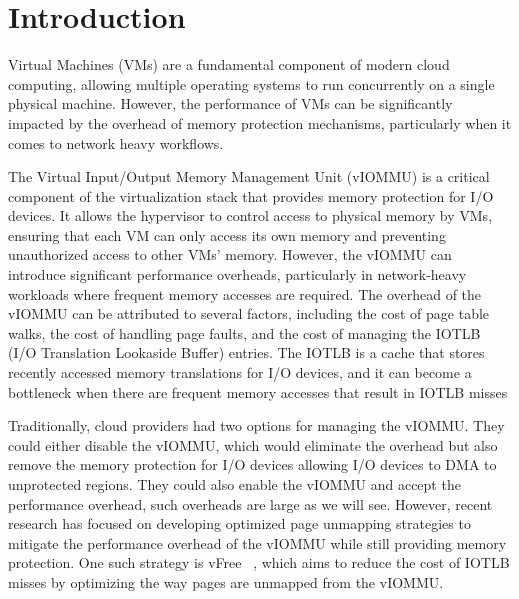 \section{Introduction}
\label{sec:introduction}

Virtual Machines (VMs) are a fundamental component of modern cloud computing, allowing multiple operating systems to run concurrently on a single physical machine. However, the performance of VMs can be significantly impacted by the overhead of memory protection mechanisms, particularly when it comes to network heavy workflows.

The Virtual Input/Output Memory Management Unit (vIOMMU) is a critical component of the virtualization stack that provides memory protection for I/O devices. It allows the hypervisor to control access to physical memory by VMs, ensuring that each VM can only access its own memory and preventing unauthorized access to other VMs' memory. However, the vIOMMU can introduce significant performance overheads, particularly in network-heavy workloads where frequent memory accesses are required. The overhead of the vIOMMU can be attributed to several factors, including the cost of page table walks, the cost of handling page faults, and the cost of managing the IOTLB (I/O Translation Lookaside Buffer) entries. The IOTLB is a cache that stores recently accessed memory translations for I/O devices, and it can become a bottleneck when there are frequent memory accesses that result in IOTLB misses

Traditionally, cloud providers had two options for managing the vIOMMU. They could either disable the vIOMMU, which would eliminate the overhead but also remove the memory protection for I/O devices allowing I/O devices to DMA to unprotected regions. They could also enable the vIOMMU and accept the performance overhead, such overheads are large as we will see. However, recent research has focused on developing optimized page unmapping strategies to mitigate the performance overhead of the vIOMMU while still providing memory protection. One such strategy is vFree ~\cite{vFree}, which aims to reduce the cost of IOTLB misses by optimizing the way pages are unmapped from the vIOMMU. 


